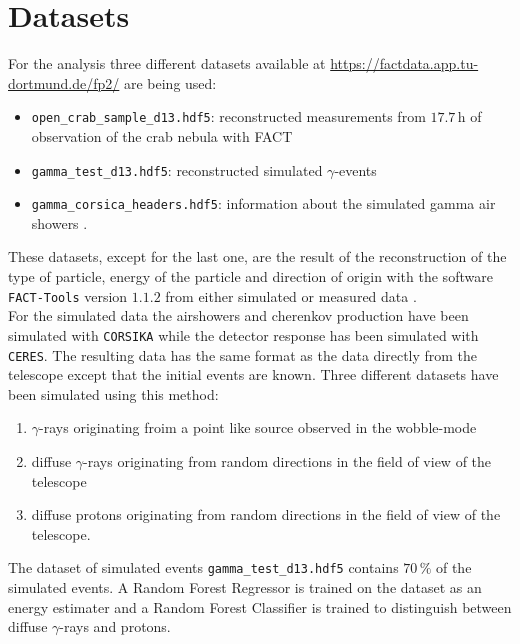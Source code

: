 \section{Datasets}
\label{sec:Durchführung}
For the analysis three different datasets available at \href{https://factdata.app.tu-dortmund.de/fp2/}{https://factdata.app.tu-dortmund.de/fp2/} are being used:
\begin{itemize}
    \item \texttt{open\_crab\_sample\_d13.hdf5}: reconstructed measurements from $17.7 \, \text{h}$ of observation of the crab nebula with FACT
    \item \texttt{gamma\_test\_d13.hdf5}: reconstructed simulated $\gamma$-events
    \item \texttt{gamma\_corsica\_headers.hdf5}: information about the simulated gamma air showers .
\end{itemize}
These datasets, except for the last one, are the result of the reconstruction of the type of particle, energy of the particle and direction
of origin with the software \texttt{FACT-Tools} version $1.1.2$ from either simulated or measured data \cite{FACT-tools}. \\
For the simulated data the airshowers and cherenkov production have been simulated with \texttt{CORSIKA}\cite{CORSIKA} while the detector response has been simulated with
\texttt{CERES}. The resulting data has the same format as the data directly from the telescope except that the initial events are known.
Three different datasets have been simulated using this method:
\begin{enumerate}
    \item $\gamma$-rays originating froim a point like source observed in the wobble-mode
    \item diffuse $\gamma$-rays originating from random directions in the field of view of the telescope
    \item diffuse protons originating from random directions in the field of view of the telescope.
\end{enumerate}
The dataset of simulated events \texttt{gamma\_test\_d13.hdf5} contains $70 \, \%$ of the simulated events.
A Random Forest Regressor is trained on the dataset as an energy estimater and a Random Forest Classifier is trained to distinguish between diffuse
$\gamma$-rays and protons.


